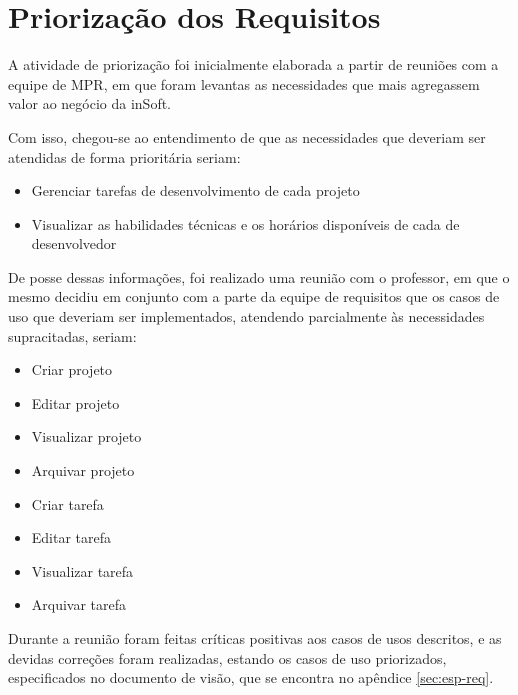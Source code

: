 \chapter{Priorização dos Requisitos}
\label{sec:priorizacao}

A atividade de priorização foi inicialmente elaborada a partir de reuniões com a equipe de MPR, em que foram levantas as necessidades que mais agregassem valor ao negócio da inSoft.

Com isso, chegou-se ao entendimento de que as necessidades que deveriam ser atendidas de forma prioritária seriam:

\begin{itemize}
  \item Gerenciar tarefas de desenvolvimento de cada projeto
  \item Visualizar as habilidades técnicas e os horários disponíveis de cada de desenvolvedor
\end{itemize}

De posse dessas informações, foi realizado uma reunião com o professor, em que o mesmo decidiu em conjunto com a parte da equipe de requisitos que os casos de uso que deveriam ser implementados, atendendo parcialmente às necessidades supracitadas, seriam:

\begin{itemize}
  \item Criar projeto
  \item Editar projeto
  \item Visualizar projeto
  \item Arquivar projeto
  \item Criar tarefa
  \item Editar tarefa
  \item Visualizar tarefa
  \item Arquivar tarefa
\end{itemize}

Durante a reunião foram feitas críticas positivas aos casos de usos descritos, e as devidas correções foram realizadas, estando os casos de uso priorizados, especificados no documento de visão, que se encontra no apêndice \ref{sec:esp-req}.
